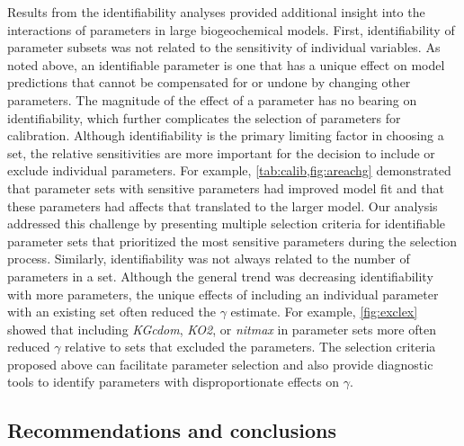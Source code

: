 \documentclass[review]{elsarticle}\usepackage[]{graphicx}\usepackage[]{color}
\begin{document}
Results from the identifiability analyses provided additional insight into the interactions of parameters in large biogeochemical models.  First, identifiability of parameter subsets was not related to the sensitivity of individual variables. As noted above, an identifiable parameter is one that has a unique effect on model predictions that cannot be compensated for or undone by changing other parameters. The magnitude of the effect of a parameter has no bearing on identifiability, which further complicates the selection of parameters for calibration.  Although identifiability is the primary limiting factor in choosing a set, the relative sensitivities are more important for the decision to include or exclude individual parameters.  For example, \cref{tab:calib,fig:areachg} demonstrated that parameter sets with sensitive parameters had improved model fit and that these parameters had affects that translated to the larger model. Our analysis addressed this challenge by presenting multiple selection criteria for identifiable parameter sets that prioritized the most sensitive parameters during the selection process.  Similarly, identifiability was not always related to the number of parameters in a set. Although the general trend was decreasing identifiability with more parameters, the unique effects of including an individual parameter with an existing set often reduced the $\gamma$ estimate. For example, \cref{fig:exclex} showed that including \textit{KGcdom}, \textit{KO2}, or \textit{nitmax} in parameter sets more often reduced $\gamma$ relative to sets that excluded the parameters.  The selection criteria proposed above can facilitate parameter selection and also provide diagnostic tools to identify parameters with disproportionate effects on $\gamma$.

\subsection{Recommendations and conclusions}
\end{document}
